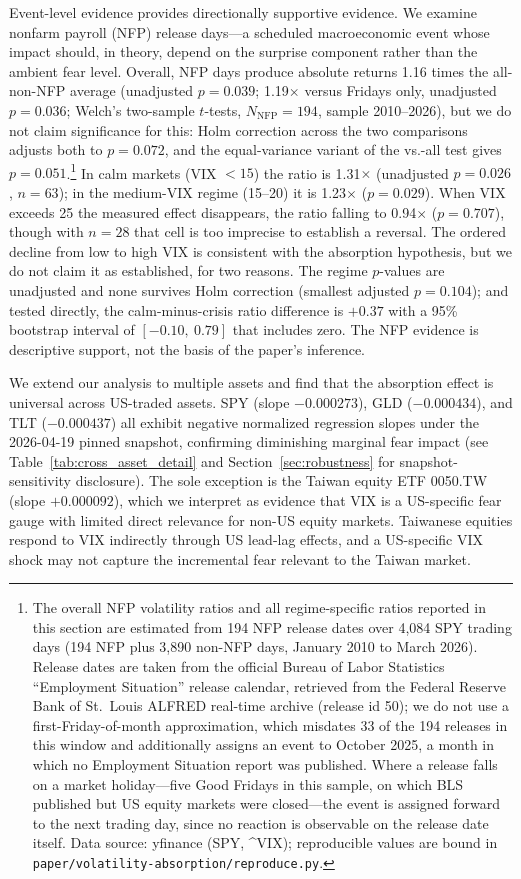 \documentclass[12pt,a4paper]{article}
\begin{document}
Event-level evidence provides directionally supportive evidence. We examine nonfarm payroll (NFP) release days---a scheduled macroeconomic event whose impact should, in theory, depend on the surprise component rather than the ambient fear level. Overall, NFP days produce absolute returns 1.16 times the all-non-NFP average (unadjusted $p = 0.039$; 1.19$\times$ versus Fridays only, unadjusted $p = 0.036$; Welch's two-sample $t$-tests, $N_{\text{NFP}} = 194$, sample 2010--2026), but we do not claim significance for this: Holm correction across the two comparisons adjusts both to $p = 0.072$, and the equal-variance variant of the vs.-all test gives $p = 0.051$.\footnote{The overall NFP volatility ratios and all regime-specific ratios reported in this section are estimated from 194 NFP release dates over 4{,}084 SPY trading days (194 NFP plus 3{,}890 non-NFP days, January 2010 to March 2026). Release dates are taken from the official Bureau of Labor Statistics ``Employment Situation'' release calendar, retrieved from the Federal Reserve Bank of St.\ Louis ALFRED real-time archive (release id 50); we do not use a first-Friday-of-month approximation, which misdates 33 of the 194 releases in this window and additionally assigns an event to October 2025, a month in which no Employment Situation report was published. Where a release falls on a market holiday---five Good Fridays in this sample, on which BLS published but US equity markets were closed---the event is assigned forward to the next trading day, since no reaction is observable on the release date itself. Data source: yfinance (SPY, \^{}VIX); reproducible values are bound in \texttt{paper/volatility-absorption/reproduce.py}.} In calm markets (VIX $< 15$) the ratio is 1.31$\times$ (unadjusted $p = 0.026$, $n = 63$); in the medium-VIX regime (15--20) it is 1.23$\times$ ($p = 0.029$). When VIX exceeds 25 the measured effect disappears, the ratio falling to 0.94$\times$ ($p = 0.707$), though with $n = 28$ that cell is too imprecise to establish a reversal. The ordered decline from low to high VIX is consistent with the absorption hypothesis, but we do not claim it as established, for two reasons. The regime $p$-values are unadjusted and none survives Holm correction (smallest adjusted $p = 0.104$); and tested directly, the calm-minus-crisis ratio difference is $+0.37$ with a 95\% bootstrap interval of $[-0.10,\ 0.79]$ that includes zero. The NFP evidence is descriptive support, not the basis of the paper's inference.

We extend our analysis to multiple assets and find that the absorption effect is universal across US-traded assets. SPY (slope $-0.000273$), GLD ($-0.000434$), and TLT ($-0.000437$) all exhibit negative normalized regression slopes under the 2026-04-19 pinned snapshot, confirming diminishing marginal fear impact (see Table~\ref{tab:cross_asset_detail} and Section~\ref{sec:robustness} for snapshot-sensitivity disclosure). The sole exception is the Taiwan equity ETF 0050.TW (slope $+0.000092$), which we interpret as evidence that VIX is a US-specific fear gauge with limited direct relevance for non-US equity markets. Taiwanese equities respond to VIX indirectly through US lead-lag effects, and a US-specific VIX shock may not capture the incremental fear relevant to the Taiwan market.
\end{document}
